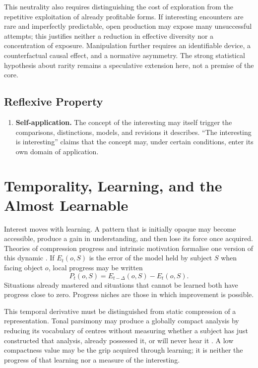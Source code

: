 \documentclass[11pt,a4paper]{article}
\begin{document}
This neutrality also requires distinguishing the cost of exploration from the
repetitive exploitation of already profitable forms. If interesting encounters
are rare and imperfectly predictable, open production may expose many
unsuccessful attempts; this justifies neither a reduction in effective diversity
nor a concentration of exposure. Manipulation further requires an identifiable
device, a counterfactual causal effect, and a normative asymmetry. The strong
statistical hypothesis about rarity remains a speculative extension here, not a
premise of the core.

\subsection{Reflexive Property}

\begin{enumerate}[resume]
  \item \textbf{Self-application.} The concept of the interesting may itself
        trigger the comparisons, distinctions, models, and revisions it
        describes. ``The interesting is interesting'' claims that the concept
        may, under certain conditions, enter its own domain of application.
\end{enumerate}

\section{Temporality, Learning, and the Almost Learnable}

Interest moves with learning. A pattern that is initially opaque may become
accessible, produce a gain in understanding, and then lose its force once
acquired. Theories of compression progress and intrinsic motivation formalise
one version of this dynamic
\parencite{schmidhuber1997interesting,schmidhuber2009compression,oudeyer2007intrinsic,oudeyer2007typology}.
If \(E_t(o,S)\) is the error of the model held by subject \(S\) when facing
object \(o\), local progress may be written
\[
  P_t(o,S)=E_{t-\Delta}(o,S)-E_t(o,S).
\]
Situations already mastered and situations that cannot be learned both have
progress close to zero. Progress niches are those in which improvement is
possible.

This temporal derivative must be distinguished from static compression of a
representation. Tonal parsimony may produce a globally compact analysis by
reducing its vocabulary of centres without measuring whether a subject has just
constructed that analysis, already possessed it, or will never hear it
\parencite{pachet2026tonalparsimony}. A low compactness value may be the grip
acquired through learning; it is neither the progress of that learning nor a
measure of the interesting.
\end{document}
